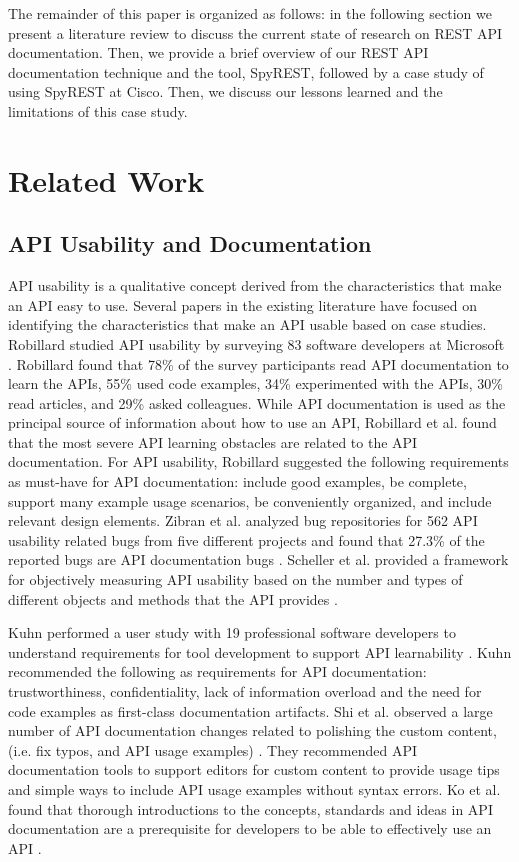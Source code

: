 \documentclass[10pt, conference]{IEEEtran}
\begin{document}
The remainder of this paper is organized as follows: in the following section we present a literature review to discuss the current state of research on REST API documentation. Then, we provide a brief overview of our REST API documentation technique and the tool, SpyREST, followed by a case study of using SpyREST at Cisco. Then, we discuss our lessons learned and the limitations of this case study.


\section{Related Work}

\subsection{API Usability and Documentation} %

API usability is a qualitative concept derived from the characteristics that make an API easy to use. Several papers in the existing literature have focused on identifying the characteristics that make an API usable based on case studies. Robillard studied API usability by surveying 83 software developers at Microsoft \cite{Robillard_a_field_study}. Robillard found that 78\% of the survey participants read API documentation to learn the APIs, 55\% used code examples, 34\% experimented with the APIs, 30\% read articles, and 29\% asked colleagues. While API documentation is used as the principal source of information about how to use an API, Robillard et al. found that the most severe API learning obstacles are related to the API documentation. For API usability, Robillard suggested the following requirements as must-have for API documentation: include good examples, be complete, support many example usage scenarios, be conveniently organized, and include relevant design elements. Zibran et al. analyzed bug repositories  for 562 API usability related bugs from five different projects and found that 27.3\% of the reported bugs are API documentation bugs \cite{zibran2011useful}. Scheller et al. provided a framework for objectively measuring API usability based on the number and types of different objects and methods that the API provides \cite{scheller2015automated}.

Kuhn performed a user study with 19 professional software developers to understand requirements for tool development to support API learnability \cite{Kuhn_on_designing}. Kuhn recommended the following as requirements for API documentation: trustworthiness, confidentiality, lack of information overload and the need for code examples as first-class documentation artifacts. Shi et al. observed a large number of API documentation changes related to polishing the custom content, (i.e. fix typos, and API usage examples) \cite{shi2011empirical}. They recommended API documentation tools to support editors for custom content to provide usage tips and simple ways to include API usage examples without syntax errors. Ko et al. found that thorough introductions to the concepts, standards and ideas in API documentation are a prerequisite for developers to be able to effectively use an API  \cite{ko2011role}.
\end{document}

